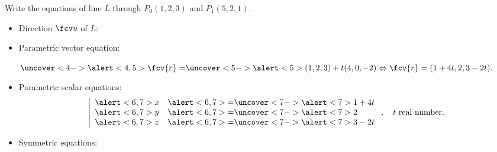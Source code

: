 \begin{frame}
\begin{example}

Write the equations of line $L$ through $P_0(1,2,3)$ and $P_1(5,2,1)$.

\begin{itemize}
\item<2-> Direction $\fcv u$ of $L$: 
\item<4-> Parametric vector equation:

$  \uncover<4->{\alert<4,5>{\fcv{r}=}} \uncover<5->{
\alert<5>{
( 1,2,3) + t ( 4, 0, -2) \Leftrightarrow  \fcv{r} = ( 1+4t, 2, 3-2t)
} .}
$
\item<6-> Parametric scalar equations:
\[\left|
\begin{array}{ll}
\alert<6,7>{x} & \alert<6,7>{=}\uncover<7->{\alert<7>{ 1+4t}} \\
\alert<6,7>{y} & \alert<6,7>{=}\uncover<7->{\alert<7>{ 2 }}\\
\alert<6,7>{z} & \alert<6,7>{=}\uncover<7->{\alert<7>{ 3-2t}}
\end{array}
\right. , \quad t \text{ real number.}\]
%
\item<8-> \alert<8>{Symmetric equations:}
\end{itemize}
\end{example}
\end{frame}

